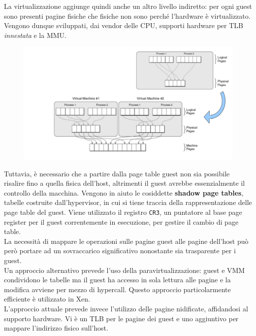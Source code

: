 \documentclass{article}
\begin{document}
		La virtualizzazione aggiunge quindi anche un altro livello indiretto: per ogni guest sono presenti pagine fisiche che fisiche non sono perché l'hardware è virtualizzato. Vengono dunque sviluppati, dai vendor
		delle CPU, supporti hardware per TLB \emph{innestata} e la MMU.
		\begin{figure}[ht]
			\centering
			\includegraphics[width=0.7\linewidth]{images/SAC_B5_nestedtlb}
			\label{fig:sacb5nestedtlb}
		\end{figure}
		
		Tuttavia, è necessario che a partire dalla page table guest non sia possibile risalire fino a quella fisica dell'host, altrimenti il guest avrebbe essenzialmente il controllo della macchina. Vengono in aiuto le cosiddette \textbf{shadow page tables}, tabelle costruite dall'hypervisor, in cui si tiene traccia della rappresentazione delle page table del guest. Viene utilizzato il registro \verb*|CR3|, un puntatore al base page register per il guest correntemente in esecuzione, per gestire il cambio di page table.\\
		La necessità di mappare le operazioni sulle pagine guest alle pagine dell'host può però portare ad un sovraccarico significativo nonostante sia trasparente per i guest.\\ 
		
		Un approccio alternativo prevede l'uso della paravirtualizzazione: guest e VMM condividono le tabelle ma il guest ha accesso in sola lettura alle pagine e la modifica avviene per mezzo di hypercall.
		Questo approccio particolarmente efficiente è utilizzato in Xen.\\
		
		L'approccio attuale prevede invece l'utilizzo delle pagine nidificate, affidandosi al supporto hardware. Vi è un TLB per le pagine dei guest e uno aggiuntivo per mappare l'indirizzo fisico sull'host.
		
\end{document}
